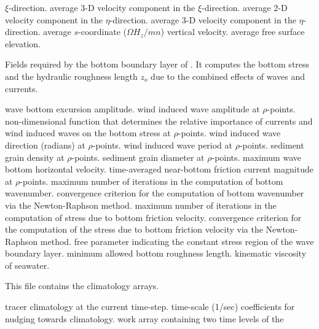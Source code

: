 \begin{klist}
\begin{klist}
  $\xi$-direction.
           average 3-D velocity component in the
  $\xi$-direction.
           average 2-D velocity component in the
  $\eta$-direction.
           average 3-D velocity component in the
  $\eta$-direction.
           average $s$-coordinate ($\Omega H_z/mn$)
vertical velocity.
          average free surface elevation.
    \end{klist}
    Fields required by the bottom boundary layer of
  \cite{Styles96}.  It computes the bottom stress and
  the hydraulic roughness length $z_o$ due to the combined effects of
  waves and currents.
    \begin{klist}
                wave bottom excursion amplitude.
             wind induced wave amplitude at $\rho$-points.
                non-dimensional function that determines the
    relative importance of currents and wind induced waves on the bottom
    stress at $\rho$-points.
             wind induced wave direction (radians) at
    $\rho$-points.
             wind induced wave period at $\rho$-points.
             sediment grain density at $\rho$-points.
             sediment grain diameter at $\rho$-points.
                maximum wave bottom horizontal velocity.
            time-averaged near-bottom friction current
    magnitude at $\rho$-points.
          maximum number of iterations in the
    computation of bottom wavenumber.
           convergence criterion for the computation of
   bottom wavenumber via the Newton-Raphson method.
          maximum number of iterations in the
   computation of stress due to bottom friction velocity.
           convergence criterion for the computation
   of the stress due to bottom friction velocity via the
   Newton-Raphson method.
          free parameter indicating the constant
   stress region of the wave boundary layer.
         minimum allowed bottom roughness length.
             kinematic viscosity of seawater.
    \end{klist}
    This file contains the climatology arrays.
    \begin{klist}
              tracer climatology at the current time-step.
           time-scale (1/sec) coefficients for nudging
    towards climatology.
            work array containing two time levels of the

\end{klist}
\end{klist}
